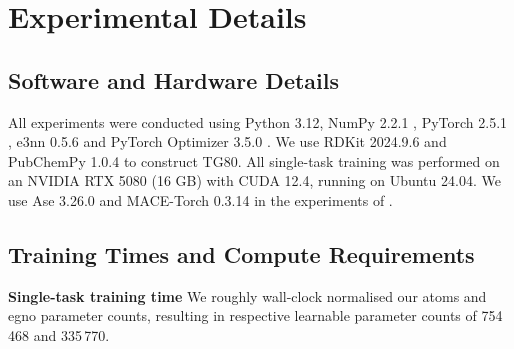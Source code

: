 
\section{Experimental Details}
\label{sect:details}

\subsection{Software and Hardware Details}
All experiments were conducted using Python 3.12, NumPy 2.2.1 \cite{harris_array_2020}, PyTorch 2.5.1 \cite{paszke_pytorch_2019}, e3nn 0.5.6 \cite{geiger_e3nn_2022} and PyTorch Optimizer 3.5.0 \cite{kim_pytorch_optimizer_2021}. We use RDKit 2024.9.6 \cite{greg_landrum_rdkitrdkit_2025} and PubChemPy 1.0.4 to construct TG80. All single-task training was performed on an NVIDIA RTX 5080 (16 GB) with CUDA 12.4, running on Ubuntu 24.04. {We use Ase 3.26.0 \cite{larsen_atomic_2017} and MACE-Torch 0.3.14 \cite{kovacs_mace-off_2025} in the experiments of .}

\subsection{Training Times and Compute Requirements}
\label{sec:model_compute_time}
\textbf{Single-task training time} We roughly wall-clock normalised our \gls{atoms} and \gls{egno} parameter counts, resulting in respective learnable parameter counts of 754\,468 and 335\,770.

